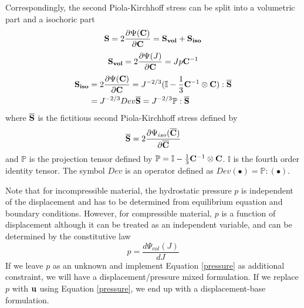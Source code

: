Correspondingly, the second Piola-Kirchhoff stress can be split into a volumetric part and a isochoric part
\begin{equation} \label{S}
\bold{S} =  2\frac{\partial{\Psi({\bold{C})}}}{\partial{\bold{C}}} = \bold{S_{vol}}  + \bold{S_{iso}} 
\end{equation}
\begin{equation} \label{Svol}
\bold{S_{vol}} = 2\frac{\partial{\Psi(J)}}{\partial{\bold{C}}} = Jp{\bold{C}} ^{-1}
\end{equation}
\begin{equation} \label{Siso}
\begin{split}
\bold{S_{iso}} & = 2\frac{\partial{\Psi({\bold{C})}}}{\partial{\bold{C}}} = J^{-2/3}(\mathbb{I} - \frac{1}{3}\bold{C}^{-1} \otimes \bold{C}):\overline{\bold{S}} \\
&  = J^{-2/3}Dev\overline{\bold{S}} = J^{-2/3}\mathbb{P}:\overline{\bold{S}}
\end{split}
\end{equation}
where  $\overline{\bold{S}}$ is the fictitious second Piola-Kirchhoff stress defined by
\begin{equation} \label{fictitious}
\overline{\bold{S}} = 2\frac{\partial\Psi_{iso}({\overline{\bold{C}})}}{\partial\overline{\bold{C}}}
\end{equation}
and $\mathbb{P}$ is the projection tensor defined by $\mathbb{P} = \mathbb{I} - \frac{1}{3}\bold{C}^{-1} \otimes \bold{C} $. $\mathbb{I}$ is the fourth order identity tensor. The symbol $Dev$ is an operator defined as $Dev(\bullet) = \mathbb{P}:(\bullet)$.

Note that for incompressible material, the hydrostatic pressure $p$ is independent of the displacement and has to be determined from equilibrium equation and boundary conditions. However, for compressible material,  $p$ is a function of displacement although it can be treated as an independent variable, and can be determined by the constitutive law
\begin{equation} \label{pressure}
p = \frac{d\Psi_{vol}(J)}{dJ}
\end{equation}
If we leave $p$ as an unknown and implement Equation \ref{pressure} as additional constraint, we will have a displacement/pressure mixed formulation. If we replace $p$ with $\bold{u}$ using Equation \ref{pressure}, we end up with a displacement-base formulation.

%
